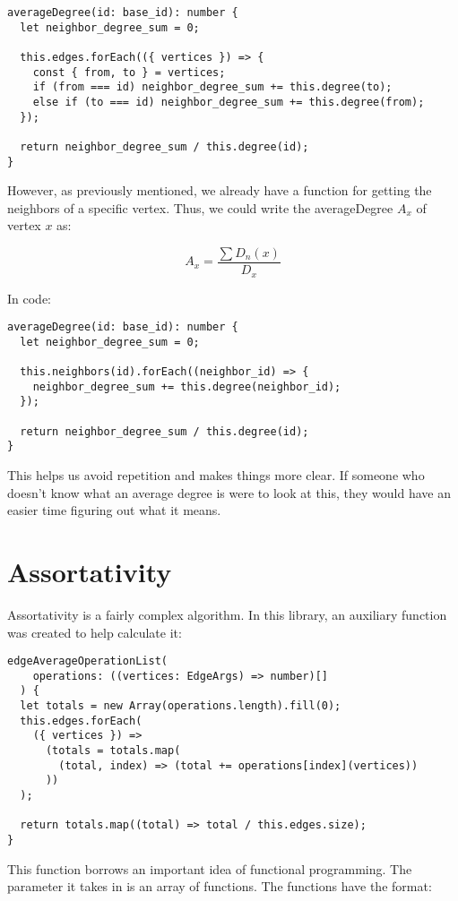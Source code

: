 \begin{verbatim}
averageDegree(id: base_id): number {
  let neighbor_degree_sum = 0;

  this.edges.forEach(({ vertices }) => {
    const { from, to } = vertices;
    if (from === id) neighbor_degree_sum += this.degree(to);
    else if (to === id) neighbor_degree_sum += this.degree(from);
  });

  return neighbor_degree_sum / this.degree(id);
}
\end{verbatim}

However, as previously mentioned, we already have a function for getting the neighbors of a specific vertex.
Thus, we could write the averageDegree $A_x$ of vertex $x$ as:

$$A_x=\frac{\sum{D_n(x)}}{D_x}$$

In code:

\begin{verbatim}
averageDegree(id: base_id): number {
  let neighbor_degree_sum = 0;

  this.neighbors(id).forEach((neighbor_id) => {
    neighbor_degree_sum += this.degree(neighbor_id);
  });

  return neighbor_degree_sum / this.degree(id);
}
\end{verbatim}

This helps us avoid repetition and makes things more clear.
If someone who doesn't know what an average degree is were to look at this,
they would have an easier time figuring out what it means.

\section{Assortativity}

Assortativity is a fairly complex algorithm.
In this library, an auxiliary function was created to help calculate it:

\begin{verbatim}
edgeAverageOperationList(
    operations: ((vertices: EdgeArgs) => number)[]
  ) {
  let totals = new Array(operations.length).fill(0);
  this.edges.forEach(
    ({ vertices }) =>
      (totals = totals.map(
        (total, index) => (total += operations[index](vertices))
      ))
  );

  return totals.map((total) => total / this.edges.size);
}
\end{verbatim}

This function borrows an important idea of functional programming.
The parameter it takes in is an array of functions.
The functions have the format:

